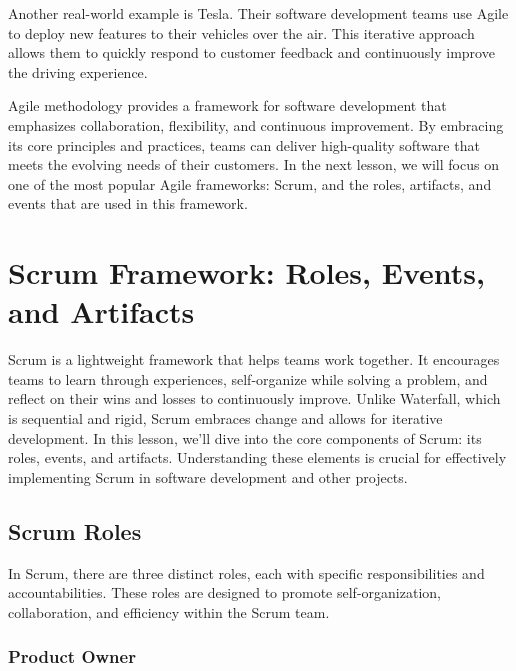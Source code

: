 Another real-world example is Tesla. Their software development teams use Agile
to deploy new features to their vehicles over the air. This iterative approach
allows them to quickly respond to customer feedback and continuously improve
the driving experience.

Agile methodology provides a framework for software development that emphasizes
collaboration, flexibility, and continuous improvement. By embracing its core
principles and practices, teams can deliver high-quality software that meets
the evolving needs of their customers. In the next lesson, we will focus on one
of the most popular Agile frameworks: Scrum, and the roles, artifacts, and
events that are used in this framework.

\section{Scrum Framework: Roles, Events, and Artifacts}

Scrum is a lightweight framework that helps teams work together. It encourages
teams to learn through experiences, self-organize while solving a problem, and
reflect on their wins and losses to continuously improve. Unlike Waterfall,
which is sequential and rigid, Scrum embraces change and allows for iterative
development. In this lesson, we'll dive into the core components of Scrum: its
roles, events, and artifacts. Understanding these elements is crucial for
effectively implementing Scrum in software development and other projects.


\subsection{Scrum Roles}

In Scrum, there are three distinct roles, each with specific responsibilities
and accountabilities. These roles are designed to promote self-organization,
collaboration, and efficiency within the Scrum team.


\subsubsection{Product Owner}

